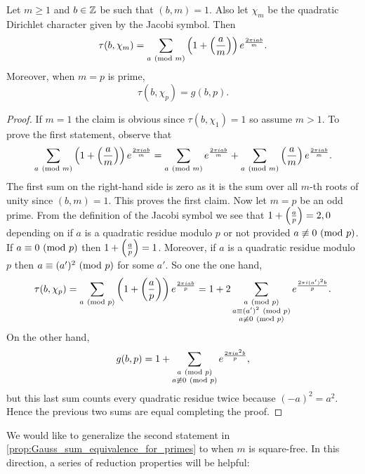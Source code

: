       \begin{proposition}\label{prop:Gauss_sum_equivalence_for_primes}
        Let $m \ge 1$ and $b \in \mathbb{Z}$ be such that $(b,m) = 1$. Also let $\chi_{m}$ be the quadratic Dirichlet character given by the Jacobi symbol. Then
        \[
          \tau(b,\chi_{m}) = \sum_{a \ (\mathrm{mod}\text{ }m)}\left(1+\left(\frac{a}{m}\right)\right)e^{\frac{2\pi iab}{m}}.
        \]
        Moreover, when $m = p$ is prime,
        \[
          \tau(b,\chi_{p}) = g(b,p).
        \]
      \end{proposition}
      \begin{proof}
        If $m = 1$ the claim is obvious since $\tau(b,\chi_{1}) = 1$ so assume $m > 1$. To prove the first statement, observe that
        \[
          \sum_{a \ (\mathrm{mod}\text{ }m)}\left(1+\left(\frac{a}{m}\right)\right)e^{\frac{2\pi iab}{m}} = \sum_{a \ (\mathrm{mod}\text{ }m)}e^{\frac{2\pi iab}{m}}+\sum_{a \ (\mathrm{mod}\text{ }m)}\left(\frac{a}{m}\right)e^{\frac{2\pi iab}{m}}.
        \]
        The first sum on the right-hand side is zero as it is the sum over all $m$-th roots of unity since $(b,m) = 1$. This proves the first claim. Now let $m = p$ be an odd prime. From the definition of the Jacobi symbol we see that $1+\textstyle{\left(\frac{a}{p}\right)} = 2,0$ depending on if $a$ is a quadratic residue modulo $p$ or not provided $a \not\equiv 0 \ (\mathrm{mod}\text{ }p)$. If $a \equiv 0 \ (\mathrm{mod}\text{ }p)$ then $1+\textstyle{\left(\frac{a}{p}\right)} = 1$. Moreover, if $a$ is a quadratic residue modulo $p$ then $a \equiv (a')^{2} \ (\mathrm{mod}\text{ }p)$ for some $a'$. So one the one hand,
        \[
          \tau(b,\chi_{p}) = \sum_{a \ (\mathrm{mod}\text{ }p)}\left(1+\left(\frac{a}{p}\right)\right)e^{\frac{2\pi iab}{p}} = 1+2\sum_{\substack{a \ (\mathrm{mod}\text{ }p) \\ a \equiv (a')^{2} \ (\mathrm{mod}\text{ }p) \\ a \not\equiv 0 \ (\mathrm{mod}\text{ }p)}}e^{\frac{2\pi i(a')^{2}b}{p}}.
        \]
        On the other hand,
        \[
          g(b,p) = 1+\sum_{\substack{a \ (\mathrm{mod}\text{ }p) \\ a \not\equiv 0 \ (\mathrm{mod}\text{ }p)}}e^{\frac{2\pi ia^{2}b}{p}},
        \]
        but this last sum counts every quadratic residue twice because $(-a)^{2} = a^{2}$. Hence the previous two sums are equal completing the proof.
      \end{proof}

      We would like to generalize the second statement in \cref{prop:Gauss_sum_equivalence_for_primes} to when $m$ is square-free. In this direction, a series of reduction properties will be helpful:

